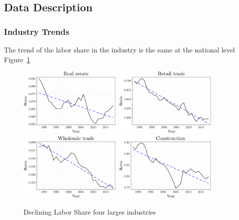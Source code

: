 \documentclass[12pt]{article}
\begin{document}
\subsection{Data Description}

\subsubsection{Industry Trends}

The trend of the labor share in the industry is the same at the national level Figure~\ref*{fig:labor_share_by_industry}

\begin{figure}[H]
 \centering
 \includegraphics[width=0.45\textwidth]{../images/industries/labor_share/dec531.pdf}
 \hspace*{0.05\textwidth}
 \includegraphics[width=0.45\textwidth]{../images/industries/labor_share/dec44RT.pdf}
 \vfill
 \includegraphics[width=0.45\textwidth]{../images/industries/labor_share/dec42.pdf}
 \hspace*{0.05\textwidth}
 \includegraphics[width=0.45\textwidth]{../images/industries/labor_share/dec23.pdf}
 \caption{\label{fig:labor_share_by_industry} Declining Labor Share four larges industries}
\end{figure}
\end{document}

